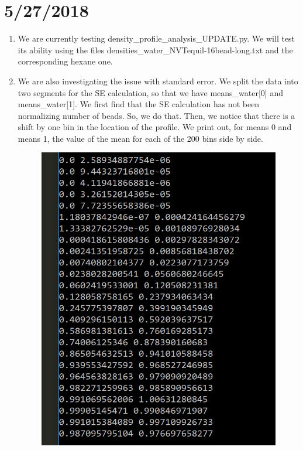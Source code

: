 \documentclass[12pt,reqno]{amsart}
\numberwithin{equation}{section}
\begin{document}
\section{5/27/2018}
\begin{enumerate}
\item We are currently testing density\_profile\_analysis\_UPDATE.py.  We will test its ability using the files densities\_water\_NVTequil-16bead-long.txt and the corresponding hexane one.  
\item We are also investigating the issue with standard error.  We split the data into two segments for the SE calculation, so that we have means\_water[0] and means\_water[1].  We first find that the SE calculation has not been normalizing number of beads.  So, we do that.  Then, we notice that there is a shift by one bin in the location of the profile.  We print out, for means 0 and means 1, the value of the mean for each of the 200 bins side by side.  
\begin{figure}[H]
\centering
\includegraphics[scale=0.6]{interface_density_binshift}
\end{figure}

\end{enumerate}
\end{document}
